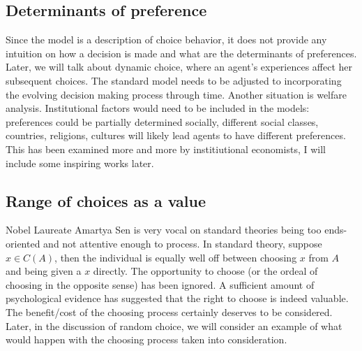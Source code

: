 \subsection*{Determinants of preference}
Since the model is a description of choice behavior, it does not provide any intuition on how a decision is made and what are the determinants of preferences. Later, we will talk about dynamic choice, where an agent's experiences affect her subsequent choices.
The standard model needs to be adjusted to incorporating the evolving decision making process through time. Another situation is welfare analysis. Institutional factors would need to be included in the models: preferences could be partially determined socially,
different social classes, countries, religions, cultures will likely lead agents to have different preferences. This has been examined more and more by institiutional economists, I will include some inspiring works later.

\subsection*{Range of choices as a value}
Nobel Laureate Amartya Sen is very vocal on standard theories being too ends-oriented and not attentive enough to process. In standard theory, suppose $x\in C(A)$, then the individual is equally well off between choosing $x$ from $A$ and being given a $x$ directly.
The opportunity to choose (or the ordeal of choosing in the opposite sense) has been ignored. A sufficient amount of psychological evidence has suggested that the right to choose is indeed valuable. The benefit/cost of the choosing process certainly deserves to be considered.
Later, in the discussion of random choice, we will consider an example of what would happen with the choosing process taken into consideration.
